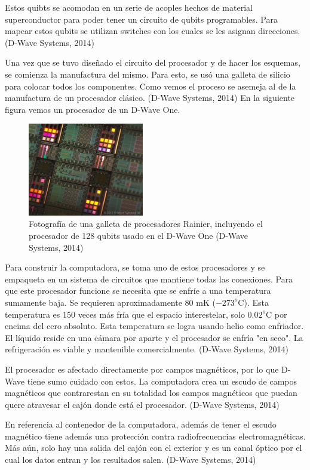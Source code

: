 \documentclass[11pt,a4paper]{article}
\begin{document}
Estos quibts se acomodan en un serie de acoples hechos de material superconductor para poder tener un circuito de qubits programables. Para mapear estos qubits se utilizan switches con los cuales se les asignan direcciones. (D-Wave Systems, 2014)

Una vez que se tuvo diseñado el circuito del procesador y de hacer los esquemas, se comienza la manufactura del mismo. Para esto, se usó una galleta de silicio para colocar todos los componentes. Como vemos el proceso se asemeja al de la manufactura de un procesador clásico. (D-Wave Systems, 2014) En la siguiente figura vemos un procesador de un D-Wave One.
\clearpage
\begin{figure}
\centering
\includegraphics[width=0.45\textwidth]{proce}
\caption{Fotografía de una galleta de procesadores Rainier, incluyendo el procesador de 128 qubits usado en el D-Wave One (D-Wave Systems, 2014)}
\end{figure}

Para construir la computadora, se toma uno de estos procesadores y se empaqueta en un sistema de circuitos que mantiene todas las conexiones. Para que este procesador funcione se necesita que se enfríe a una temperatura sumamente baja. Se requieren aproximadamente 80 mK ($-273^o$C). Esta temperatura es 150 veces más fría que el espacio interestelar, solo $0.02^o$C por encima del cero absoluto. Esta temperatura se logra usando helio como enfriador. El líquido reside en una cámara por aparte y el procesador se enfría "en seco". La refrigeración es viable y mantenible comercialmente. (D-Wave Systems, 2014)

El procesador es afectado directamente por campos magnéticos, por lo que D-Wave tiene sumo cuidado con estos. La computadora crea un escudo de campos magnéticos que contrarestan en su totalidad los campos magnéticos que puedan quere atravesar el cajón donde está el procesador. (D-Wave Systems, 2014)

En referencia al contenedor de la computadora, además de tener el escudo magnético tiene además una protección contra radiofrecuencias electromagnéticas. Más aún, solo hay una salida del cajón con el exterior y es un canal óptico por el cual los datos entran y los resultados salen.  (D-Wave Systems, 2014)
\end{document}
